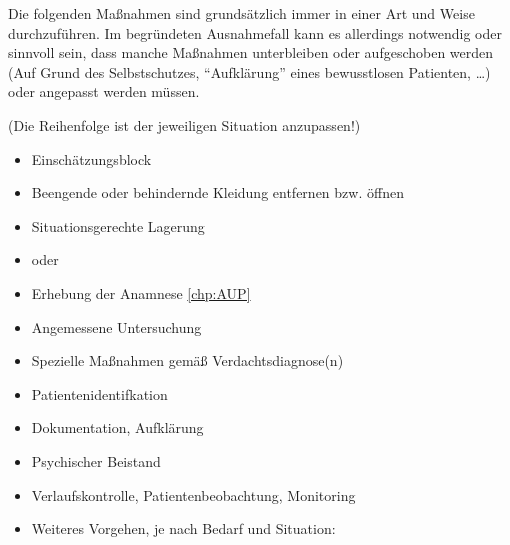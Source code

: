 {\label{m:standardmassnahmen-immer}}{%
Die folgenden Maßnahmen sind grundsätzlich immer in einer  Art und Weise durchzuführen. Im begründeten Ausnahmefall kann es
allerdings notwendig oder sinnvoll sein, dass manche Maßnahmen unterbleiben oder
aufgeschoben werden (Auf Grund des Selbstschutzes, \enquote{Aufklärung} eines bewusstlosen Patienten,
\ldots{}) oder angepasst werden müssen.

{\scriptsize (Die Reihenfolge ist der jeweiligen Situation anzupassen!)}
\begin{itemize}
  \item Einschätzungsblock 
  \item Beengende oder behindernde Kleidung entfernen bzw.
  öffnen
  \item Situationsgerechte Lagerung
  \item {} oder 
  \item Erhebung der Anamnese \ref{chp:AUP}
  \item Angemessene Untersuchung 
  \item Spezielle Maßnahmen gemäß Verdachtsdiagnose(n)
  \item Patientenidentifkation
  \item Dokumentation, Aufklärung
  \item Psychischer Beistand
  \item Verlaufskontrolle, Patientenbeobachtung, Monitoring
  \columnbreak
  \item Weiteres Vorgehen, je nach Bedarf und Situation:
  
  
 

\end{itemize}}
